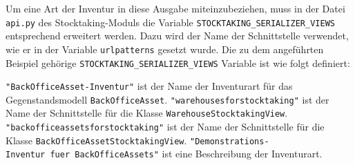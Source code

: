 \begin{Shaded}
\begin{Highlighting}[]
\FunctionTok{\{}
    \FunctionTok{:} \FunctionTok{\{}
        \FunctionTok{:} \FunctionTok{,}
        \FunctionTok{:} \FunctionTok{,}
        \FunctionTok{:} 
    \FunctionTok{\},}
    \FunctionTok{:} \FunctionTok{\{}
        \FunctionTok{:} \FunctionTok{,}
        \FunctionTok{:} \FunctionTok{,}
        \FunctionTok{:} 
    \FunctionTok{\}}
\FunctionTok{\}}
\end{Highlighting}
\end{Shaded}

Um eine Art der Inventur in diese Ausgabe miteinzubeziehen, muss in der
Datei \texttt{api.py} des Stocktaking-Moduls die Variable
\texttt{STOCKTAKING\_SERIALIZER\_VIEWS} entsprechend erweitert werden.
Dazu wird der Name der Schnittstelle verwendet, wie er in der Variable
\texttt{urlpatterns} gesetzt wurde. Die zu dem angeführten Beispiel
gehörige \texttt{STOCKTAKING\_SERIALIZER\_VIEWS} Variable ist wie folgt
definiert:

\begin{Shaded}
\begin{Highlighting}[]
\OperatorTok{=}\NormalTok{ \{}
    \NormalTok{: (}
        \NormalTok{, }
        \NormalTok{, }
\NormalTok{    ),}
    \NormalTok{: (}
        \NormalTok{, }
        \NormalTok{, }
\NormalTok{    )}
\NormalTok{\}}
\end{Highlighting}
\end{Shaded}

\texttt{"BackOfficeAsset-Inventur"} ist der Name der Inventurart für das
Gegenstandsmodell \texttt{BackOfficeAsset}.
\texttt{"warehousesforstocktaking"} ist der Name der Schnittstelle für
die Klasse \texttt{WarehouseStocktakingView}.
\texttt{"backofficeassetsforstocktaking"} ist der Name der Schnittstelle
für die Klasse \texttt{BackOfficeAssetStocktakingView}.
\texttt{"Demonstrations-Inventur\ fuer\ BackOfficeAssets"} ist eine
Beschreibung der Inventurart.

